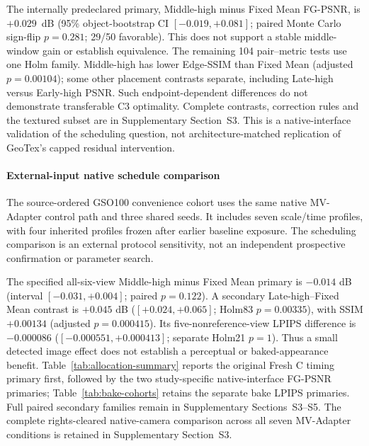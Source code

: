 \documentclass[times,twocolumn,final]{elsarticle}
\begin{document}
The internally predeclared primary, Middle-high minus Fixed Mean FG-PSNR, is $+0.029$~dB (95\% object-bootstrap CI $[-0.019,+0.081]$; paired Monte Carlo sign-flip $p=0.281$; 29/50 favorable). This does not support a stable middle-window gain or establish equivalence. The remaining 104 pair--metric tests use one Holm family. Middle-high has lower Edge-SSIM than Fixed Mean (adjusted $p=0.00104$); some other placement contrasts separate, including Late-high versus Early-high PSNR. Such endpoint-dependent differences do not demonstrate transferable C3 optimality. Complete contrasts, correction rules and the textured subset are in Supplementary Section~S3. This is a native-interface validation of the scheduling question, not architecture-matched replication of GeoTex's capped residual intervention.


\paragraph{External-input native schedule comparison}
The source-ordered GSO100 convenience cohort uses the same native MV-Adapter control path and three shared seeds. It includes seven scale/time profiles, with four inherited profiles frozen after earlier baseline exposure. The scheduling comparison is an external protocol sensitivity, not an independent prospective confirmation or parameter search.

The specified all-six-view Middle-high minus Fixed Mean primary is $-0.014$ dB (interval $[-0.031,+0.004]$; paired $p=0.122$). A secondary Late-high--Fixed Mean contrast is $+0.045$ dB ($[+0.024,+0.065]$; Holm83 $p=0.00335$), with SSIM $+0.00134$ (adjusted $p=0.000415$). Its five-nonreference-view LPIPS difference is $-0.000086$ ($[-0.000551,+0.000413]$; separate Holm21 $p=1$). Thus a small detected image effect does not establish a perceptual or baked-appearance benefit. Table~\ref{tab:allocation-summary} reports the original Fresh C timing primary first, followed by the two study-specific native-interface FG-PSNR primaries; Table~\ref{tab:bake-cohorts} retains the separate bake LPIPS primaries. Full paired secondary families remain in Supplementary Sections~S3--S5. The complete rights-cleared native-camera comparison across all seven MV-Adapter conditions is retained in Supplementary Section~S3.
\end{document}
